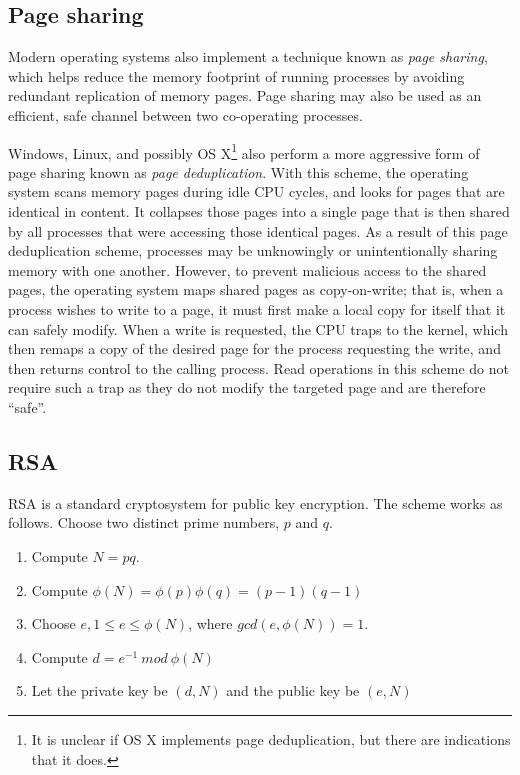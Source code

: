 \documentclass[11pt]{llncs}
\begin{document}
\subsection{Page sharing} %

Modern operating systems also implement a technique known as \textit{page
sharing}, which helps reduce the memory footprint of running processes by
avoiding redundant replication of memory pages. Page sharing may also be used as
an efficient, safe channel between two co-operating processes.

Windows, Linux, and possibly OS X\footnote{It is unclear if OS X
implements page deduplication, but there are indications that it does.} also perform a
more aggressive form of page sharing known as \textit{page deduplication}. With
this scheme, the operating system scans memory pages during idle CPU cycles, and
looks for pages that are identical in content. It collapses those pages into a
single page that is then shared by all processes that were accessing those
identical pages. As a result of this page deduplication scheme, processes may be
unknowingly or unintentionally sharing memory with one another. However, to
prevent malicious access to the shared pages, the operating system maps shared
pages as copy-on-write; that is, when a process wishes to write to a page, it
must first make a local copy for itself that it can safely modify. When a write
is requested, the CPU traps to the kernel, which then remaps a copy of the
desired page for the process requesting the write, and then returns control to
the calling process. Read operations in this scheme do not require such a trap
as they do not modify the targeted page and are therefore ``safe''.

\subsection{RSA}

RSA is a standard cryptosystem for public key encryption. The scheme works as
follows. Choose two distinct prime numbers, $p$ and $q$.

\begin{enumerate}
    \item Compute $N = pq$.
    \item Compute $\phi(N) = \phi(p)\phi(q) = (p-1)(q-1)$
    \item Choose $e, 1 \leq e \leq \phi(N)$, where $gcd(e,\phi(N)) = 1$.
    \item Compute $d = e^{-1}\ mod\ \phi(N)$
    \item Let the private key be $(d,N)$ and the public key be $(e,N)$
\end{enumerate}
\end{document}
